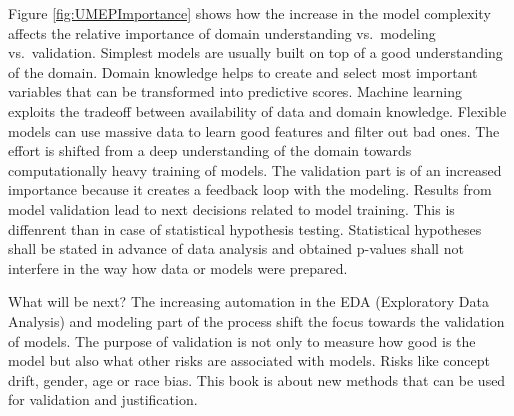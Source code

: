 \documentclass[12pt,]{krantz}
\begin{document}
Figure \ref{fig:UMEPImportance} shows how the increase in the model complexity affects the relative importance of domain understanding vs.~modeling vs.~validation. Simplest models are usually built on top of a good understanding of the domain. Domain knowledge helps to create and select most important variables that can be transformed into predictive scores. Machine learning exploits the tradeoff between availability of data and domain knowledge. Flexible models can use massive data to learn good features and filter out bad ones. The effort is shifted from a deep understanding of the domain towards computationally heavy training of models. The validation part is of an increased importance because it creates a feedback loop with the modeling. Results from model validation lead to next decisions related to model training. This is diffenrent than in case of statistical hypothesis testing. Statistical hypotheses shall be stated in advance of data analysis and obtained p-values shall not interfere in the way how data or models were prepared.

What will be next? The increasing automation in the EDA (Exploratory Data Analysis) and modeling part of the process shift the focus towards the validation of models. The purpose of validation is not only to measure how good is the model but also what other risks are associated with models. Risks like concept drift, gender, age or race bias. This book is about new methods that can be used for validation and justification.
\end{document}
